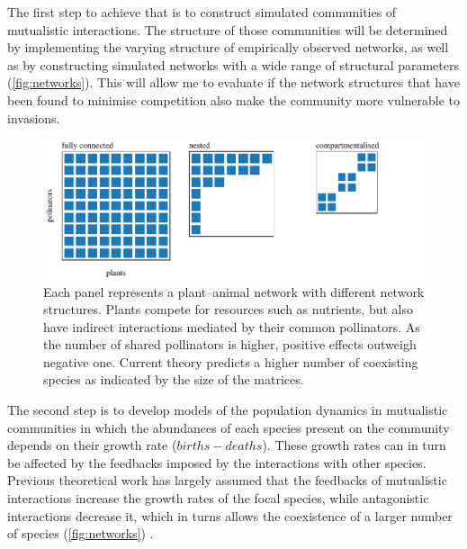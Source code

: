 \documentclass[a4paper]{article}
\begin{document}
The first step to achieve that is to construct simulated communities of mutualistic interactions.
The structure of those communities will be determined by implementing the varying structure of empirically observed networks, as well as by constructing simulated networks with a wide range of structural parameters (\autoref{fig:networks}).
This will allow me to evaluate if the network structures that have been found to minimise competition also make the community more vulnerable to invasions.

\begin{figure}[tbp]
  \includegraphics{networks}
  \caption{
  \label{fig:networks}
  Each panel represents a plant–animal network with different network structures.
  Plants compete for resources such as nutrients, but also have indirect interactions mediated by their common pollinators.
  As the number of shared pollinators is higher, positive effects outweigh negative one.
  Current theory predicts a higher number of coexisting species as indicated by the size of the matrices.
  }
\end{figure}

The second step is to develop models of the population dynamics in mutualistic communities in which the abundances of each species present on the community depends on their growth rate ($births - deaths$).
These growth rates can in turn be affected by the feedbacks imposed by the interactions with other species.
Previous theoretical work has largely assumed that the feedbacks of mutualistic interactions increase the growth rates of the focal species, while antagonistic interactions decrease it, which in turns allows the coexistence of a larger number of species (\autoref{fig:networks}) \citep{Moeller2004, Bastolla2009}.
\end{document}
